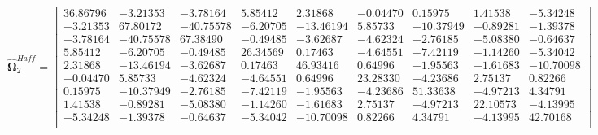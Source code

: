 \documentclass{article}\usepackage[]{graphicx}\usepackage[]{xcolor}
\def\bs{\boldsymbol}
\begin{document}
 \[
 \widehat{\bs{\Omega}}_{2}^{Haff} = 
 
  \begin{bmatrix}
 
 
 
 36.86796 & -3.21353 & -3.78164 & 5.85412 & 2.31868 & -0.04470 & 0.15975 & 1.41538 & -5.34248\\
 
 -3.21353 & 67.80172 & -40.75578 & -6.20705 & -13.46194 & 5.85733 & -10.37949 & -0.89281 & -1.39378\\
 
 -3.78164 & -40.75578 & 67.38490 & -0.49485 & -3.62687 & -4.62324 & -2.76185 & -5.08380 & -0.64637\\
 
 5.85412 & -6.20705 & -0.49485 & 26.34569 & 0.17463 & -4.64551 & -7.42119 & -1.14260 & -5.34042\\
 
 2.31868 & -13.46194 & -3.62687 & 0.17463 & 46.93416 & 0.64996 & -1.95563 & -1.61683 & -10.70098\\
 
 -0.04470 & 5.85733 & -4.62324 & -4.64551 & 0.64996 & 23.28330 & -4.23686 & 2.75137 & 0.82266\\
 
 0.15975 & -10.37949 & -2.76185 & -7.42119 & -1.95563 & -4.23686 & 51.33638 & -4.97213 & 4.34791\\
 
 1.41538 & -0.89281 & -5.08380 & -1.14260 & -1.61683 & 2.75137 & -4.97213 & 22.10573 & -4.13995\\
 
 -5.34248 & -1.39378 & -0.64637 & -5.34042 & -10.70098 & 0.82266 & 4.34791 & -4.13995 & 42.70168\\
 \end{bmatrix}
 \]
 
\end{document}
